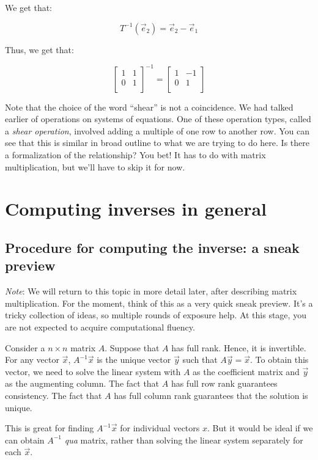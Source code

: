 \documentclass[10pt]{amsart}
\begin{document}
We get that:

$$T^{-1}(\vec{e}_2) = \vec{e}_2 - \vec{e}_1$$

Thus, we get that:

$$\left[\begin{matrix} 1 & 1 \\ 0 & 1 \\\end{matrix}\right]^{-1} = \left[\begin{matrix} 1 & - 1 \\ 0 & 1 \\\end{matrix}\right]$$

Note that the choice of the word ``shear'' is not a coincidence. We
had talked earlier of operations on systems of equations. One of these
operation types, called a {\em shear operation}, involved adding a
multiple of one row to another row. You can see that this is similar
in broad outline to what we are trying to do here. Is there a
formalization of the relationship? You bet! It has to do with matrix
multiplication, but we'll have to skip it for now.
\section{Computing inverses in general}

\subsection{Procedure for computing the inverse: a sneak preview}

{\em Note}: We will return to this topic in more detail later, after
describing matrix multiplication. For the moment, think of this as a
very quick sneak preview. It's a tricky collection of ideas, so
multiple rounds of exposure help. At this stage, you are not expected
to acquire computational fluency.

Consider a $n \times n$ matrix $A$. Suppose that $A$ has full
rank. Hence, it is invertible. For any vector $\vec{x}$,
$A^{-1}\vec{x}$ is the unique vector $\vec{y}$ such that $A\vec{y} =
\vec{x}$. To obtain this vector, we need to solve the linear system
with $A$ as the coefficient matrix and $\vec{y}$ as the augmenting
column. The fact that $A$ has full row rank guarantees
consistency. The fact that $A$ has full column rank guarantees that
the solution is unique.

This is great for finding $A^{-1}\vec{x}$ for individual vectors
$x$. But it would be ideal if we can obtain $A^{-1}$ {\em qua} matrix,
rather than solving the linear system separately for each $\vec{x}$.
\end{document}
